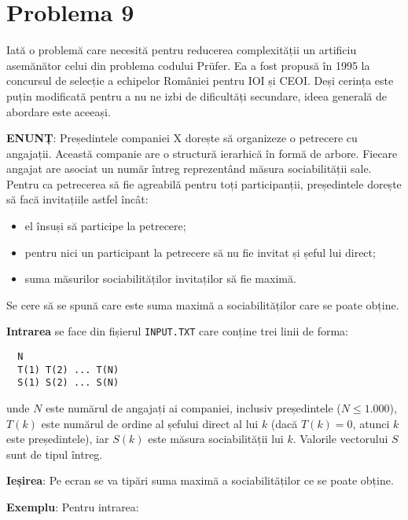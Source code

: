 \section{Problema 9}

Iată o problemă care necesită pentru reducerea complexității un artificiu
asemănător celui din problema codului Prüfer. Ea a fost propusă în 1995 la
concursul de selecție a echipelor României pentru IOI și CEOI. Deși cerința
este puțin modificată pentru a nu ne izbi de dificultăți secundare, ideea
generală de abordare este aceeași.

{\bf ENUNȚ}: Președintele companiei X dorește să organizeze o petrecere cu
angajații. Această companie are o structură ierarhică în formă de
arbore. Fiecare angajat are asociat un număr întreg reprezentând măsura
sociabilității sale. Pentru ca petrecerea să fie agreabilă pentru toți
participanții, președintele dorește să facă invitațiile astfel încât:

\begin{itemize}

\item el însuși să participe la petrecere;

\item pentru nici un participant la petrecere să nu fie invitat și șeful lui
  direct;

\item suma măsurilor sociabilităților invitaților să fie maximă.

\end{itemize}

Se cere să se spună care este suma maximă a sociabilităților care se poate obține.

{\bf Intrarea} se face din fișierul {\tt INPUT.TXT} care conține trei linii de
forma:

\begin{verbatim}
  N
  T(1) T(2) ... T(N)
  S(1) S(2) ... S(N)
\end{verbatim}

unde $N$ este numărul de angajați ai companiei, inclusiv președintele ($N \leq
1.000$), $T(k)$ este numărul de ordine al șefului direct al lui $k$ (dacă
$T(k) = 0$, atunci $k$ este președintele), iar $S(k)$ este măsura
sociabilității lui $k$. Valorile vectorului $S$ sunt de tipul întreg.

{\bf Ieșirea}: Pe ecran se va tipări suma maximă a sociabilităților ce se
poate obține.

{\bf Exemplu}: Pentru intrarea:

